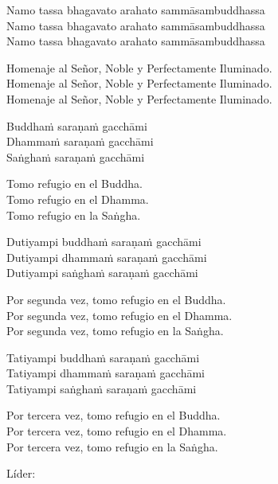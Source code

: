 Namo tassa bhagavato arahato sammāsambuddhassa\\
Namo tassa bhagavato arahato sammāsambuddhassa\\
Namo tassa bhagavato arahato sammāsambuddhassa

\begin{english}
  Homenaje al Señor, Noble y Perfectamente Iluminado.\\
  Homenaje al Señor, Noble y Perfectamente Iluminado.\\
  Homenaje al Señor, Noble y Perfectamente Iluminado.
\end{english}

Buddhaṁ saraṇaṁ gacchāmi\\
Dhammaṁ saraṇaṁ gacchāmi\\
Saṅghaṁ saraṇaṁ gacchāmi

\begin{english}
  Tomo refugio en el Buddha.\\
  Tomo refugio en el Dhamma.\\
  Tomo refugio en la Saṅgha.
\end{english}

Dutiyampi buddhaṁ saraṇaṁ gacchāmi\\
Dutiyampi dhammaṁ saraṇaṁ gacchāmi\\
Dutiyampi saṅghaṁ saraṇaṁ gacchāmi

\begin{english}
  Por segunda vez, tomo refugio en el Buddha.\\
  Por segunda vez, tomo refugio en el Dhamma.\\
  Por segunda vez, tomo refugio en la Saṅgha.
\end{english}

Tatiyampi buddhaṁ saraṇaṁ gacchāmi\\
Tatiyampi dhammaṁ saraṇaṁ gacchāmi\\
Tatiyampi saṅghaṁ saraṇaṁ gacchāmi

\clearpage

\begin{english}
  Por tercera vez, tomo refugio en el Buddha.\\
  Por tercera vez, tomo refugio en el Dhamma.\\
  Por tercera vez, tomo refugio en la Saṅgha.
\end{english}

\begin{instruction}
  Líder:
\end{instruction}

